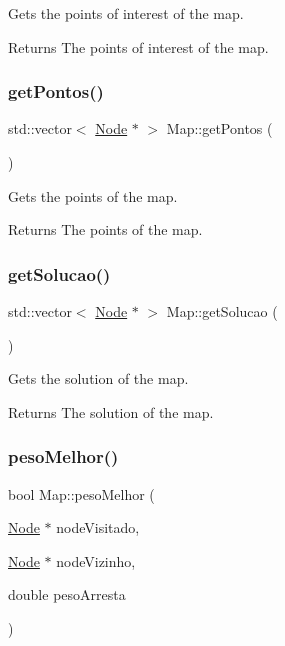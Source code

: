 Gets the points of interest of the map. 

\begin{DoxyReturn}{Returns}
The points of interest of the map. 
\end{DoxyReturn}
\mbox{\label{class_map_adfbd0b149bb751e0ac8696c75b7649a6}} 
\subsubsection{\texorpdfstring{getPontos()}{getPontos()}}
{\footnotesize\ttfamily std\+::vector$<$ \mbox{\hyperlink{class_node}{Node}} $\ast$ $>$ Map\+::get\+Pontos (\begin{DoxyParamCaption}{ }\end{DoxyParamCaption})}



Gets the points of the map. 

\begin{DoxyReturn}{Returns}
The points of the map. 
\end{DoxyReturn}
\mbox{\label{class_map_ab13f74de95fc679221c7c46f327fb43e}} 
\subsubsection{\texorpdfstring{getSolucao()}{getSolucao()}}
{\footnotesize\ttfamily std\+::vector$<$ \mbox{\hyperlink{class_node}{Node}} $\ast$ $>$ Map\+::get\+Solucao (\begin{DoxyParamCaption}{ }\end{DoxyParamCaption})}



Gets the solution of the map. 

\begin{DoxyReturn}{Returns}
The solution of the map. 
\end{DoxyReturn}
\mbox{\label{class_map_a61ca34a3511bed7fc0d97dea319c1c38}} 
\subsubsection{\texorpdfstring{pesoMelhor()}{pesoMelhor()}}
{\footnotesize\ttfamily bool Map\+::peso\+Melhor (\begin{DoxyParamCaption}\item[{\mbox{\hyperlink{class_node}{Node}} $\ast$}]{node\+Visitado,  }\item[{\mbox{\hyperlink{class_node}{Node}} $\ast$}]{node\+Vizinho,  }\item[{double}]{peso\+Arresta }\end{DoxyParamCaption})}



